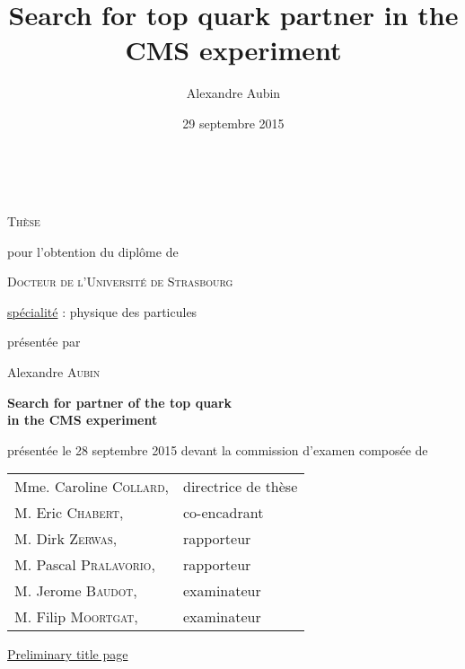 


\title{Search for top quark partner in the CMS experiment}
\author{Alexandre Aubin}
\date{29 septembre 2015}



\begin{titlepage}
    \vspace*{1cm}
    \begin{center}
        \\

        \vspace*{0.8cm}

        {\Large \textsc{Thèse}}

        \vspace*{0.8cm}

        pour l'obtention du diplôme de

        \vspace*{0.8cm}

        {\Large \textsc{Docteur de l'Université de Strasbourg}}

        \vspace*{0.8cm}

        \underline{spécialité} : physique des particules

        \vspace*{0.8cm}

        présentée par

        Alexandre \textsc{Aubin}

        \vspace*{0.8cm}

        {\Large \textbf{Search for partner of the top quark\\ in the CMS experiment}}

        \vspace*{0.8cm}

        présentée le 28 septembre 2015 devant la commission d'examen composée de

        \vspace*{0.8cm}

        \begin{tabular}{ll}
            Mme. Caroline \textsc{Collard}, & directrice de thèse\\
            M. Eric \textsc{Chabert},       & co-encadrant\\
            M. Dirk \textsc{Zerwas},        & rapporteur\\
            M. Pascal \textsc{Pralavorio},  & rapporteur\\
            M. Jerome \textsc{Baudot},      & examinateur\\
            M. Filip \textsc{Moortgat},     & examinateur\\
        \end{tabular}

        \vspace*{0.5cm}

        \underline{\Huge{Preliminary title page}}

    \end{center}
    \vspace*{1cm}
\end{titlepage}


